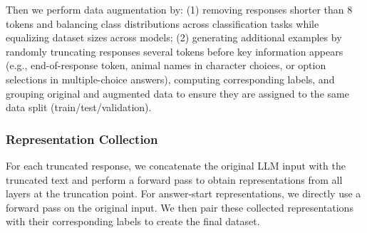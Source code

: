 Then we perform data augmentation by: (1) removing responses shorter than 8 tokens and balancing class distributions across classification tasks while equalizing dataset sizes across models; (2) generating additional examples by randomly truncating responses several tokens before key information appears (e.g., end-of-response token, animal names in character choices, or option selections in multiple-choice answers), computing corresponding labels, and grouping original and augmented data to ensure they are assigned to the same data split (train/test/validation).



\subsubsection{Representation Collection}
\label{appendix:setup_representation}
For each truncated response, we concatenate the original LLM input with the truncated text and perform a forward pass to obtain representations from all layers at the truncation point. For answer-start representations, we directly use a forward pass on the original input. We then pair these collected representations with their corresponding labels to create the final dataset.





